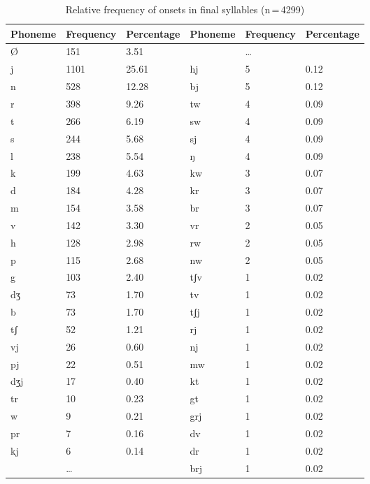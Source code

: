 \begin{table}[hp]\centering
\caption[Relative frequency of onsets in final syllables]{Relative frequency of onsets in final syllables (n\,=\,4299)}
\begin{tabu} to \textwidth{X X[c] X[c] X X[c] X[c]}
\tableheaderfont\toprule
Phoneme
	& Frequency
	& Percentage
	& Phoneme
	& Frequency
	& Percentage
	\\
	
\toprule

Ø
	& 151
	& 3.51\pct
	& 
	& \dots
	& 
	\\


j
	& 1101
	& 25.61\pct
	& hj
	& 5
	& 0.12\pct
	\\
n
	& 528
	& 12.28\pct
	& bj
	& 5
	& 0.12\pct
	\\
r
	& 398
	& 9.26\pct
	& tw
	& 4
	& 0.09\pct
	\\
t
	& 266
	& 6.19\pct
	& sw
	& 4
	& 0.09\pct
	\\
s
	& 244
	& 5.68\pct
	& sj
	& 4
	& 0.09\pct
	\\
l
	& 238
	& 5.54\pct
	& ŋ
	& 4
	& 0.09\pct
	\\
k
	& 199
	& 4.63\pct
	& kw
	& 3
	& 0.07\pct
	\\
d
	& 184
	& 4.28\pct
	& kr
	& 3
	& 0.07\pct
	\\
m
	& 154
	& 3.58\pct
	& br
	& 3
	& 0.07\pct
	\\
v
	& 142
	& 3.30\pct
	& vr
	& 2
	& 0.05\pct
	\\
h
	& 128
	& 2.98\pct
	& rw
	& 2
	& 0.05\pct
	\\
p
	& 115
	& 2.68\pct
	& nw
	& 2
	& 0.05\pct
	\\
g
	& 103
	& 2.40\pct
	& tʃv
	& 1
	& 0.02\pct
	\\
dʒ
	& 73
	& 1.70\pct
	& tv
	& 1
	& 0.02\pct
	\\
b
	& 73
	& 1.70\pct
	& tʃj
	& 1
	& 0.02\pct
	\\
tʃ
	& 52
	& 1.21\pct
	& rj
	& 1
	& 0.02\pct
	\\
vj
	& 26
	& 0.60\pct
	& nj
	& 1
	& 0.02\pct
	\\
pj
	& 22
	& 0.51\pct
	& mw
	& 1
	& 0.02\pct
	\\
dʒj
	& 17
	& 0.40\pct
	& kt
	& 1
	& 0.02\pct
	\\
tr
	& 10
	& 0.23\pct
	& gt
	& 1
	& 0.02\pct
	\\
w
	& 9
	& 0.21\pct
	& grj
	& 1
	& 0.02\pct
	\\
pr
	& 7
	& 0.16\pct
	& dv
	& 1
	& 0.02\pct
	\\
kj
	& 6
	& 0.14\pct
	& dr
	& 1
	& 0.02\pct
	\\

	& \dots
	& 
	& brj
	& 1
	& 0.02\pct
	\\

\bottomrule
\end{tabu}
\label{tab:finon}
\end{table}

